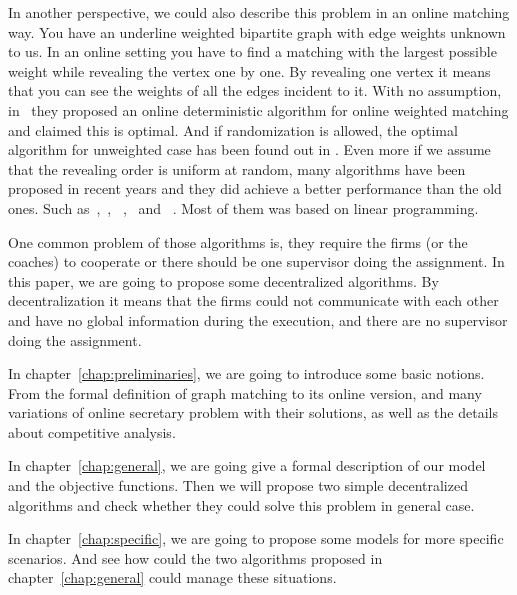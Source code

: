 In another perspective, we could also describe this problem in an online
matching way. You have an underline weighted bipartite graph with
edge weights unknown to us. In an online setting you have to find a
matching with the largest possible weight while revealing the vertex one
by one. By revealing one vertex it means that you can see the weights
of all the edges incident to it.
With no assumption, in~\cite{khuller1994line} they proposed an online
deterministic algorithm for online weighted matching and claimed this is
optimal. And if randomization is allowed,
the optimal algorithm for unweighted case has been found out in
\cite{karp1990optimal}.
Even more if we assume that the revealing order is uniform at random,
many algorithms have been proposed in recent years and they did achieve
a better performance than the old ones. Such as~\cite{aggarwal2011online},~\cite{feldman2009online},
~\cite{mahdian2011online},~\cite{mehta2007adwords} and
~\cite{bahmani2010improved}. Most of them was based on linear programming.

One common problem of those algorithms is, they require the firms 
(or the coaches) to cooperate or there should be one supervisor doing
the assignment. In this paper, we are going to propose some
decentralized algorithms. By decentralization it means that the firms
could not communicate with each other and have no global information
during the execution, and there are no supervisor doing the assignment.

In chapter~\ref{chap:preliminaries}, we are going to introduce some
basic notions. From the formal definition of graph matching to its online
version, and many variations of online secretary problem with their
solutions, as well as the details about competitive analysis.

In chapter~\ref{chap:general}, we are going give a formal description of
our model and the objective functions. Then we will propose two simple
decentralized algorithms and check whether they could solve this problem
in general case.

In chapter~\ref{chap:specific}, we are going to propose some models for
more specific scenarios. And see how could the two algorithms proposed
in chapter~\ref{chap:general} could manage these situations.

